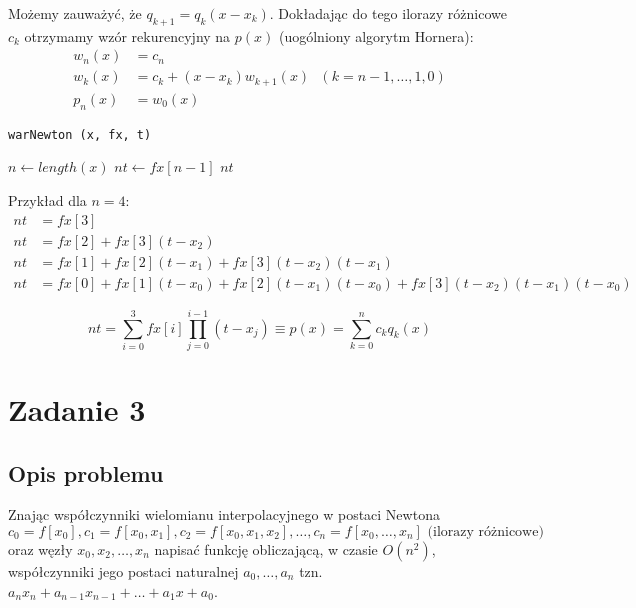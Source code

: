 \documentclass[a4paper]{article}
\begin{document}
    Możemy zauważyć, że $q_{k+1} = q_k(x - x_k)$. Dokładając do tego ilorazy różnicowe $c_k$ otrzymamy wzór rekurencyjny na $p(x)$ (uogólniony algorytm Hornera):
    \begin{align*}
        w_n(x) &= c_n \\
        w_k(x) &= c_k + (x-x_k)w_{k+1}(x) \text{    }(k = n-1, \dots, 1,0) \\
        p_n(x)   &= w_0(x)
    \end{align*}

    \begin{algorithm}
        \caption{\texttt{warNewton (x, fx, t)}}\label{alg:two}
        $n \gets length(x)$\;
        $nt \gets fx[n-1]$\;
        \Return $nt$\;
    \end{algorithm}    

    Przykład dla $n=4$:
    \begin{align}
        nt &= fx[3] \\
        nt &= fx[2] + fx[3](t-x_2) \\
        nt &= fx[1] + fx[2](t - x_1) + fx[3](t-x_2)(t - x_1) \\
        nt &= fx[0] + fx[1](t - x_0) + fx[2](t - x_1)(t - x_0) + fx[3](t-x_2)(t - x_1)(t - x_0)
    \end{align}
    
    \[ nt = \sum_{i=0}^{3} fx[i]\prod_{j=0}^{i-1}(t - x_j) \equiv p(x) = \sum_{k=0}^n c_kq_k(x) \]
\section{Zadanie 3}
    \subsection{Opis problemu}
    Znając współczynniki wielomianu interpolacyjnego w postaci Newtona \[c_0 = f[x_0], c_1 = f[x_0, x_1], c_2 = f[x_0, x_1, x_2],\dots, c_n = f[x_0, \dots, x_n] \text{ (ilorazy różnicowe)} \] oraz węzły $x_0, x_2, \dots, x_n$ napisać funkcję obliczającą, w czasie $O(n^2)$, współczynniki jego postaci naturalnej $a_0, \dots, a_n$ tzn. $a_nx_n + a_{n-1}x_{n-1} + \dots + a_1x + a_0$.
\end{document}
